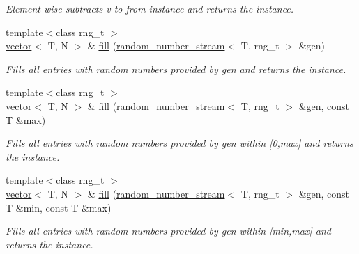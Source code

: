 \begin{DoxyCompactItemize}
\begin{DoxyCompactList}\small\item\em Element-\/wise subtracts v to from instance and returns the instance. \end{DoxyCompactList}\item 
\hypertarget{a00559_a7fa78fad2c26bf76dcc569515693482b}{{\footnotesize template$<$class rng\-\_\-t $>$ }\\\hyperlink{a00559}{vector}$<$ T, N $>$ \& \hyperlink{a00559_a7fa78fad2c26bf76dcc569515693482b}{fill} (\hyperlink{a00460}{random\-\_\-number\-\_\-stream}$<$ T, rng\-\_\-t $>$ \&gen)}\label{a00559_a7fa78fad2c26bf76dcc569515693482b}

\begin{DoxyCompactList}\small\item\em Fills all entries with random numbers provided by gen and returns the instance. \end{DoxyCompactList}\item 
\hypertarget{a00559_ad2affeafb1a2522a18619447ee2d1974}{{\footnotesize template$<$class rng\-\_\-t $>$ }\\\hyperlink{a00559}{vector}$<$ T, N $>$ \& \hyperlink{a00559_ad2affeafb1a2522a18619447ee2d1974}{fill} (\hyperlink{a00460}{random\-\_\-number\-\_\-stream}$<$ T, rng\-\_\-t $>$ \&gen, const T \&max)}\label{a00559_ad2affeafb1a2522a18619447ee2d1974}

\begin{DoxyCompactList}\small\item\em Fills all entries with random numbers provided by gen within \mbox{[}0,max\mbox{]} and returns the instance. \end{DoxyCompactList}\item 
\hypertarget{a00559_a45515ec7e82b53ad46cccd8ac9b0d1ae}{{\footnotesize template$<$class rng\-\_\-t $>$ }\\\hyperlink{a00559}{vector}$<$ T, N $>$ \& \hyperlink{a00559_a45515ec7e82b53ad46cccd8ac9b0d1ae}{fill} (\hyperlink{a00460}{random\-\_\-number\-\_\-stream}$<$ T, rng\-\_\-t $>$ \&gen, const T \&min, const T \&max)}\label{a00559_a45515ec7e82b53ad46cccd8ac9b0d1ae}

\begin{DoxyCompactList}\small\item\em Fills all entries with random numbers provided by gen within \mbox{[}min,max\mbox{]} and returns the instance. \end{DoxyCompactList}\end{DoxyCompactItemize}
